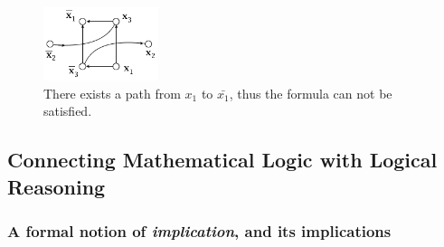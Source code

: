 \begin{figure}[h]
\begin{center}
\includegraphics[width=0.3\textwidth]{FiguresGraph/2SATno.png}
        \caption{There exists a path from $x_1$ to $\bar{x_1}$, thus the formula can not be satisfied.}
\label{2SATno}
\end{center}
\end{figure}



\subsection{Connecting Mathematical Logic with Logical
  Reasoning}
\label{sec:practical-logic}

\subsubsection{A formal notion of {\em implication}, and its
  implications}
\label{sec:implication}

